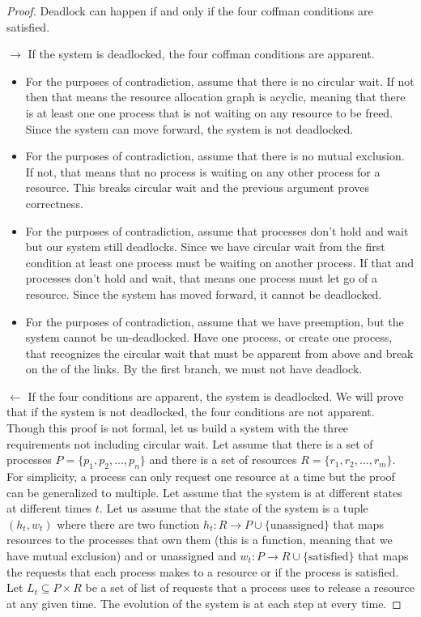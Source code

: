 \begin{proof} Deadlock can happen if and only if the four coffman conditions are satisfied.

$\rightarrow$ If the system is deadlocked, the four coffman conditions are apparent.

\begin{itemize}
\item For the purposes of contradiction, assume that there is no circular wait. If not then that means the resource allocation graph is acyclic, meaning that there is at least one one process that is not waiting on any resource to be freed. Since the system can move forward, the system is not deadlocked.
\item For the purposes of contradiction, assume that there is no mutual exclusion. If not, that means that no process is waiting on any other process for a resource. This breaks circular wait and the previous argument proves correctness.
\item For the purposes of contradiction, assume that processes don't hold and wait but our system still deadlocks. Since we have circular wait from the first condition at least one process must be waiting on another process. If that and processes don't hold and wait, that means one process must let go of a resource. Since the system has moved forward, it cannot be deadlocked.
\item For the purposes of contradiction, assume that we have preemption, but the system cannot be un-deadlocked. Have one process, or create one process, that recognizes the circular wait that must be apparent from above and break on the of the links. By the first branch, we must not have deadlock.
\end{itemize}

$\leftarrow$ If the four conditions are apparent, the system is deadlocked. We will prove that if the system is not deadlocked, the four conditions are not apparent. Though this proof is not formal, let us build a system with the three requirements not including circular wait. Let assume that there is a set of processes $P = \{p_1, p_2, ..., p_n\}$ and there is a set of resources $R = \{r_1, r_2, ..., r_m\}$. For simplicity, a process can only request one resource at a time but the proof can be generalized to multiple. Let assume that the system is at different states at different times $t$. Let us assume that the state of the system is a tuple $(h_t, w_t)$ where there are two function $h_t: R \rightarrow P \cup \{\text{unassigned}\}$ that maps resources to the processes that own them (this is a function, meaning that we have mutual exclusion) and or unassigned and $w_t: P \rightarrow R \cup \{\text{satisfied}\}$ that maps the requests that each process makes to a resource or if the process is satisfied. Let $L_t \subseteq P \times R$ be a set of list of requests that a process uses to release a resource at any given time. The evolution of the system is at each step at every time.


\end{proof}
